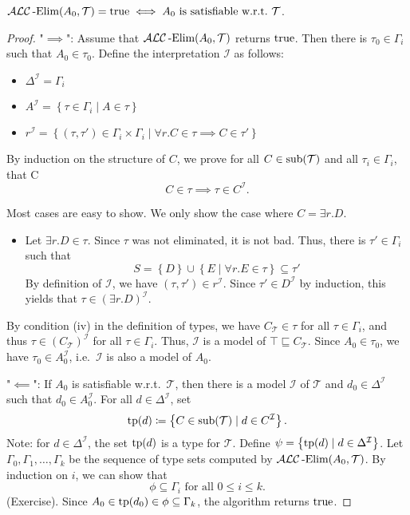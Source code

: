 \begin{lemma}
	$\mathcal{ALC}\operatorname{\text{-Elim}}(A_0, \mathcal{T}) = \mathit{\text{true}} \iff A_0 \text{ is satisfiable w.r.t.\ } \mathcal{T}$.
\end{lemma}
\begin{proof}
	"$ \implies$":
	Assume that $\mathcal{ALC}\operatorname{\text{-Elim}}(A_0, \mathcal{T})$ returns $\mathit{\text{true}}$.
	Then there is $\tau_0 \in \Gamma_i$ such that $A_0 \in \tau_0$.
	Define the interpretation $\mathcal{I}$ as follows:
	\begin{itemize}
		\item $\Delta^\mathcal{I} = \Gamma_i$
		\item $A^\mathcal{I} = \left\{ \tau \in \Gamma_i \mid A \in \tau \right\}$
		\item $r^\mathcal{I} = \left\{ (\tau, \tau') \in \Gamma_i \times \Gamma_i \mid \forall r.C \in \tau \implies C \in \tau' \right\}$
	\end{itemize}
	By induction on the structure of $C$, we prove for all $C \in \operatorname{\text{sub}}(\mathcal{T})$ and all $\tau_i \in \Gamma_i$,
	that C
	\[
		C \in \tau \implies \tau \in C^{\mathcal{I}}
	.\]
	\begin{subproof}
		Most cases are easy to show.
		We only show the case where $C = \exists r.D$.
		\begin{itemize}
			\item Let $\exists r.D \in \tau$.
				Since $\tau$ was not eliminated, it is not bad.
				Thus, there is $\tau' \in \Gamma_i$ such that
				\[
					S = \left\{ D \right\} \cup \left\{ E \mid \forall r.E \in \tau \right\} \subseteq \tau'
				\]
				By definition of $\mathcal{I}$, we have $(\tau, \tau') \in r^\mathcal{I}$.
				Since $\tau' \in D^\mathcal{I}$ by induction, this yields that $\tau \in \left( \exists r.D \right)^\mathcal{I}$.
				\qedhere
		\end{itemize}
	\end{subproof}
	By condition (iv) in the definition of types,
	we have $C_{\mathcal{T}} \in \tau$ for all $\tau \in \Gamma_i$,
	and thus $\tau \in (C_{\mathcal{T}})^\mathcal{I}$ for all $\tau \in \Gamma_i$.
	Thus, $\mathcal{I}$ is a model of $\top \sqsubseteq C_{\mathcal{T}}$.
	Since $A_0 \in \tau_0$, we have $\tau_0 \in A_0^{\mathcal{I}}$,
	i.e.\ $\mathcal{I}$ is also a model of $A_0$.

	"$ \impliedby$":
	If $A_0$ is satisfiable w.r.t.\ $\mathcal{T}$, then there is a model $\mathcal{I}$ of $\mathcal{T}$
	and $d_0 \in \Delta^\mathcal{I}$ such that $d_0 \in A_0^\mathcal{I}$.
	For all $d \in \Delta^\mathcal{I}$, set
	\[
		\operatorname{\text{tp}}(d) \coloneqq \left\{ C \in \operatorname{\text{sub}}(\mathcal{T}) \mid d \in C^\mathcal{I} \right\}
	.\]
	Note: for $d \in \Delta^\mathcal{I}$, the set $\operatorname{\text{tp}}(d)$ is a type for $\mathcal{T}$.
	Define $\psi = \left\{ \operatorname{\text{tp}}(d) \mid d \in \Delta^\mathcal{I} \right\}$.
	Let $\Gamma_0, \Gamma_1, \ldots, \Gamma_k$ be the sequence of type sets
	computed by $\mathcal{ALC}\operatorname{\text{-Elim}}(A_0, \mathcal{T})$.
	By induction on $i$, we can show that
	 \[
	\phi \subseteq \Gamma_i \text{ for all } 0 \leq i \leq k
	.\]
	(Exercise).
	Since $A_0 \in \operatorname{\text{tp}}(d_0) \in \phi \subseteq \Gamma_k$,
	the algorithm returns $\mathit{\text{true}}$.

\end{proof}


